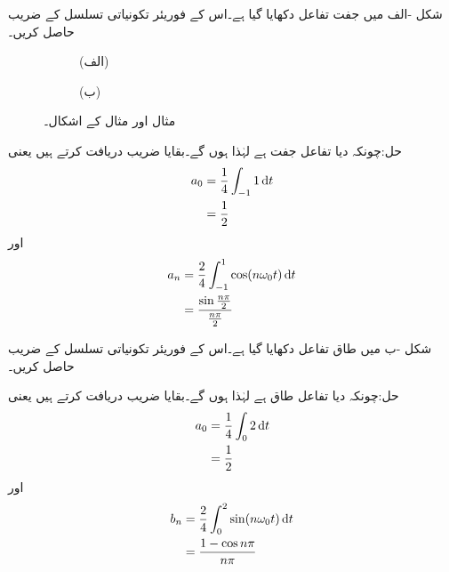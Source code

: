 شکل -الف میں جفت تفاعل دکھایا گیا ہے۔اس کے فوریئر تکونیاتی تسلسل کے  ضریب  حاصل کریں۔
\begin{figure}
\centering
\begin{subfigure}{0.5\textwidth}
\centering
{}
\caption*{(الف)}
\end{subfigure}%
\begin{subfigure}{0.5\textwidth}
\centering
{}
\caption*{(ب)}
\end{subfigure}%
\caption{مثال  اور مثال  کے اشکال۔}
\label{شکل_فوریئر_جفت_طاق_مستطیل}
\end{figure}

حل:چونکہ دیا تفاعل جفت ہے لہٰذا  ہوں گے۔بقایا  ضریب  دریافت کرتے ہیں یعنی
\begin{align*}
a_0&=\frac{1}{4}\int_{-1}{1} \dif t\\
&=\frac{1}{2}
\end{align*}
اور
\begin{align*}
a_n&=\frac{2}{4}\int_{-1}^{1} \cos (n\omega_0 t) \dif t\\
&=\frac{\sin \frac{n\pi}{2}}{\frac{n\pi}{2}}
\end{align*}

شکل -ب میں طاق تفاعل دکھایا گیا ہے۔اس کے فوریئر تکونیاتی تسلسل کے  ضریب  حاصل کریں۔

حل:چونکہ دیا تفاعل طاق ہے لہٰذا  ہوں گے۔بقایا  ضریب  دریافت کرتے ہیں یعنی
\begin{align*}
a_0&=\frac{1}{4}\int_{0}{2} \dif t\\
&=\frac{1}{2}
\end{align*}
اور
\begin{align*}
b_n&=\frac{2}{4}\int_{0}^{2} \sin (n\omega_0 t) \dif t\\
&=\frac{1-\cos n\pi}{n\pi}
\end{align*}

